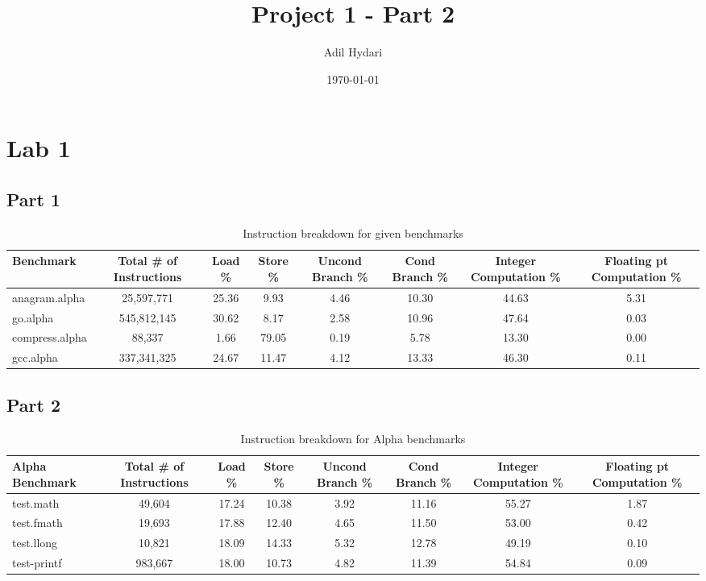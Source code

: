 \documentclass{article}
\title{Project 1 - Part 2}
\author{Adil Hydari}
\date{\today}
\begin{document}
	
	\maketitle
	\section{Lab 1}
	\subsection{Part 1}
	
	\begin{table}[ht]
		\centering
		\begin{adjustbox}{max width=\textwidth}
			\begin{tabular}{|l|c|c|c|c|c|c|c|}
				\hline
				\textbf{Benchmark}      & \textbf{Total \# of Instructions} & \textbf{Load \%} & \textbf{Store \%} & \textbf{Uncond Branch \%} & \textbf{Cond Branch \%} & \textbf{Integer Computation \%} & \textbf{Floating pt Computation \%} \\ \hline
				anagram.alpha           &25,597,771&25.36&9.93&4.46&10.30&44.63&5.31 \\ \hline
				go.alpha                &545,812,145&30.62&8.17&2.58&10.96&47.64&0.03 \\ \hline
				compress.alpha          &88,337&1.66&79.05&0.19&5.78&13.30&0.00      \\ \hline
				gcc.alpha               &337,341,325& 24.67&11.47&4.12&13.33&46.30&0.11 \\ \hline
			\end{tabular}
		\end{adjustbox}
		\caption{Instruction breakdown for given benchmarks}
	\end{table}
	
\subsection{Part 2}
	\begin{table}[ht]
	\centering
	\begin{adjustbox}{max width=\textwidth}
		\begin{tabular}{|l|c|c|c|c|c|c|c|}
			\hline
			\textbf{Alpha Benchmark}      & \textbf{Total \# of Instructions} & \textbf{Load \%} & \textbf{Store \%} & \textbf{Uncond Branch \%} & \textbf{Cond Branch \%} & \textbf{Integer Computation \%} & \textbf{Floating pt Computation \%} \\ \hline
			test.math          &49,604&17.24&10.38&3.92&11.16&55.27&1.87 \\ \hline
			test.fmath                &19,693&17.88&12.40&4.65&11.50&53.00&0.42 \\ \hline
			test.llong          &10,821&18.09&14.33&5.32&12.78&49.19&0.10      \\ \hline
			test-printf               &983,667& 18.00&10.73&4.82&11.39&54.84&0.09 \\ \hline
		\end{tabular}
	\end{adjustbox}
	\caption{Instruction breakdown for Alpha benchmarks}
\end{table}
\end{document}
